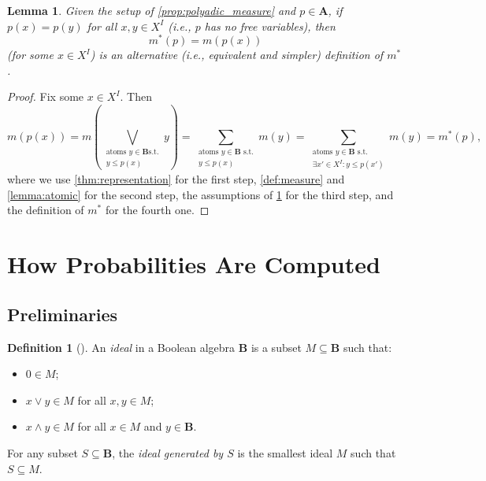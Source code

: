 \documentclass{article}
\newtheorem{lemma}{Lemma}
\theoremstyle{definition}
\newtheorem{definition}{Definition}
\theoremstyle{remark}
\begin{document}
\begin{lemma} \label{lemma:simple_measure}
  Given the setup of \cref{prop:polyadic_measure} and $p \in \mathbf{A}$, if
  $p(x) = p(y)$ for all $x, y \in X^I$ (i.e., $p$ has no free variables), then
  \[
    m^*(p) = m(p(x))
  \]
  (for some $x \in X^I$) is an alternative (i.e., equivalent and simpler)
  definition of $m^*$.
\end{lemma}
\begin{proof}
  Fix some $x \in X^I$. Then
  \[
    m(p(x)) = m \left( \bigvee_{\substack{\text{atoms } y \in \mathbf{B} \text{
            s.t.}\\
          y \le p(x)}} y \right) = \sum_{\substack{\text{atoms } y \in \mathbf{B}
        \text{ s.t.}\\
        y \le p(x)}} m(y) =\sum_{\substack{\text{atoms } y \in \mathbf{B}
        \text{ s.t.}\\
        \exists x' \in X^I : y \le p(x')}} m(y) = m^*(p),
  \]
  where we use \cref{thm:representation} for the first step,
  \cref{def:measure} and \cref{lemma:atomic} for the second step, the
  assumptions of \cref{lemma:simple_measure} for the third step, and the
  definition of $m^*$ for the fourth one.
\end{proof}

\section{How Probabilities Are Computed}

\subsection{Preliminaries}

\begin{definition}[\cite{givant2008introduction}] \label{def:boolean_ideal}
  An \emph{ideal} in a Boolean algebra $\mathbf{B}$ is a subset $M \subseteq
  \mathbf{B}$ such that:
  \begin{itemize}
  \item $0 \in M$;
  \item $x \lor y \in M$ for all $x, y \in M$;
  \item $x \land y \in M$ for all $x \in M$ and $y \in \mathbf{B}$.
  \end{itemize}
  For any subset $S \subseteq \mathbf{B}$, the \emph{ideal generated by $S$} is
  the smallest ideal $M$ such that $S \subseteq M$.
\end{definition}
\end{document}
